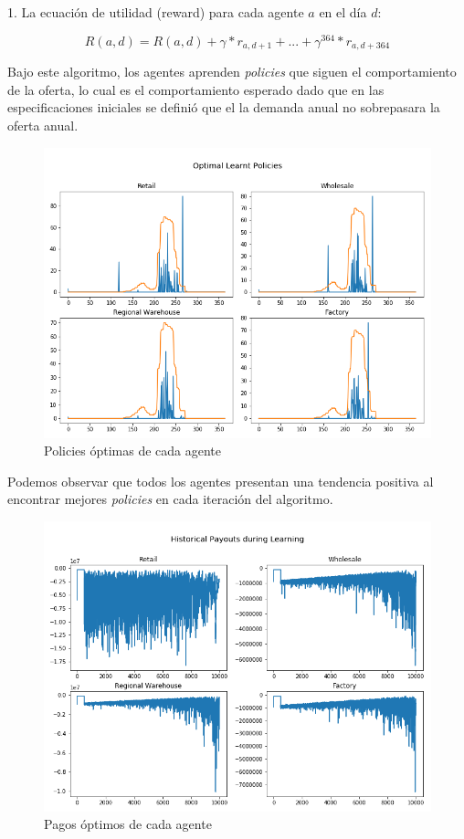 1. La ecuaci\'on de utilidad (reward) para cada agente $a$ en el d\'ia $d$:

$$
R(a, d) = R(a,d) + \gamma*r_{a, d+1} + ... + \gamma^{364}*r_{a,d+364}
$$

Bajo este algoritmo, los agentes aprenden \textit{policies} que siguen el comportamiento de la oferta, lo cual es el comportamiento esperado dado que en las especificaciones iniciales se defini\'o que el la demanda anual no sobrepasara la oferta anual. 


\begin{figure}[ht]
\caption{Policies \'optimas de cada agente}
\label{politer_policies}
\includegraphics[width=15cm]{tesis_tex/figs/policyiteration_policies.png}
\centering
\end{figure}

Podemos observar que todos los agentes presentan una tendencia positiva al encontrar mejores \textit{policies} en cada iteraci\'on del algoritmo.

\begin{figure}[ht]
\caption{Pagos \'optimos de cada agente}
\label{politer_payouts}
\includegraphics[width=15cm]{tesis_tex/figs/policyiteration_payouts.png}
\centering
\end{figure}

